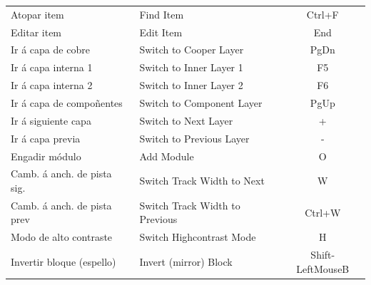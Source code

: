 \documentclass[20pt]{tikzposter} %
\begin{document}
\begin{columns}
{\begin{tabular}{l|l|c}
    Atopar item & Find Item & Ctrl+F\\
    Editar item & Edit Item & End\\
    Ir á capa de cobre & Switch to Cooper Layer & PgDn\\
    Ir á capa interna 1 & Switch to Inner Layer 1 & F5\\
    Ir á capa interna 2 & Switch to Inner Layer 2 & F6\\
    Ir á capa de compoñentes & Switch to Component Layer & PgUp\\
    Ir á siguiente capa & Switch to Next Layer & +\\
    Ir á capa previa & Switch to Previous Layer & -\\
    Engadir módulo & Add Module & O\\
    Camb. á anch. de pista sig. & Switch Track Width to Next & W\\
    Camb. á anch. de pista prev & Switch Track Width to Previous & Ctrl+W\\
    Modo de alto contraste & Switch Highcontrast Mode & H\\
    Invertir bloque (espello) & Invert (mirror) Block & Shift-LeftMouseB\\
  \end{tabular}
}

% 
% 
% 
\end{columns}
\end{document}
